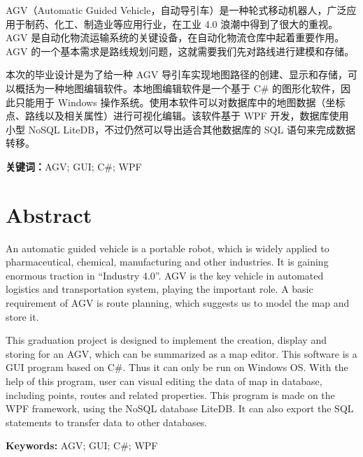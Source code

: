 
AGV（Automatic Guided Vehicle，自动导引车）是一种轮式移动机器人，广泛应用于制药、化工、制造业等应用行业，在工业 4.0 浪潮中得到了很大的重视。AGV 是自动化物流运输系统的关键设备，在自动化物流仓库中起着重要作用。AGV 的一个基本需求是路线规划问题，这就需要我们先对路线进行建模和存储。

本次的毕业设计是为了给一种 AGV 导引车实现地图路径的创建、显示和存储，可以概括为一种地图编辑软件。本地图编辑软件是一个基于 C\# 的图形化软件，因此只能用于 Windows 操作系统。使用本软件可以对数据库中的地图数据（坐标点、路线以及相关属性）进行可视化编辑。该软件基于 WPF 开发，数据库使用小型 NoSQL LiteDB，不过仍然可以导出适合其他数据库的 SQL 语句来完成数据转移。

\bigskip

\textbf{关键词：}AGV; GUI; C\#; WPF

\newpage

\chapter*{Abstract}

An automatic guided vehicle is a portable robot, which is widely applied to pharmaceutical, chemical, manufacturing and other industries. It is gaining enormous traction in ``Industry 4.0''. AGV is the key vehicle in automated logistics and transportation system, playing the important role. A basic requirement of AGV is route planning, which suggests us to model the map and store it.

This graduation project is designed to implement the creation, display and storing for an AGV, which can be summarized as a map editor. This software is a GUI program based on C\#. Thus it can only be run on Windows OS. With the help of this program, user can visual editing the data of map in database, including points, routes and related properties. This program is made on the WPF framework, using the NoSQL database LiteDB. It can also export the SQL statements to transfer data to other databases.

\bigskip

\textbf{Keywords:} AGV; GUI; C\#; WPF
